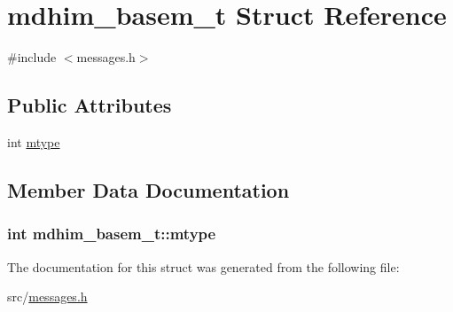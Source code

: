 \hypertarget{structmdhim__basem__t}{\section{mdhim\-\_\-basem\-\_\-t Struct Reference}
\label{de/df7/structmdhim__basem__t}
}


{\ttfamily \#include $<$messages.\-h$>$}

\subsection*{Public Attributes}
\begin{DoxyCompactItemize}
\item 
int \hyperlink{structmdhim__basem__t_a3697e7a3c6c37abc3f267277123b02b6}{mtype}
\end{DoxyCompactItemize}


\subsection{Member Data Documentation}
\hypertarget{structmdhim__basem__t_a3697e7a3c6c37abc3f267277123b02b6}{
\subsubsection[{mtype}]{\setlength{\rightskip}{0pt plus 5cm}int mdhim\-\_\-basem\-\_\-t\-::mtype}}\label{de/df7/structmdhim__basem__t_a3697e7a3c6c37abc3f267277123b02b6}


The documentation for this struct was generated from the following file\-:\begin{DoxyCompactItemize}
\item 
src/\hyperlink{messages_8h}{messages.\-h}\end{DoxyCompactItemize}
